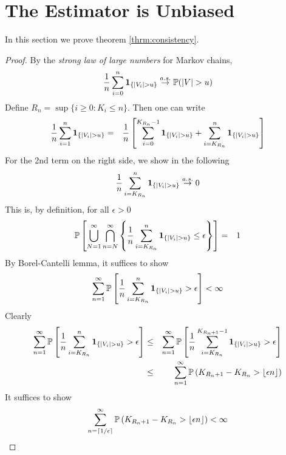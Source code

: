 \section{The Estimator is Unbiased}\label{sec:consistency}
In this section we prove theorem \ref{thrm:consistency}.
\begin{proof}
  By the {\em strong law of large numbers} for Markov chains,
  \begin{eqnarray*}
    {1 \over n} \sum_{i=0}^n \mathbf{1}_{\{|V_i| > u\}} \overset{a.s.}{\to} \mathbb{P}(|V| > u)
  \end{eqnarray*}
  Define $R_n =\sup\{i \geq 0: K_i \leq n\}$. Then one can write
  \begin{eqnarray}
    {1 \over n} \sum_{i=1}^n \mathbf{1}_{\{|V_i| > u\}}
    &=& 
    {1 \over n} \left[
      \sum_{i=0}^{K_{R_n}-1} \mathbf{1}_{\{|V_i| > u\}} + \sum_{i=K_{R_n}}^n \mathbf{1}_{\{|V_i| > u\}}
    \right]
    \label{eq:kioj}
  \end{eqnarray}
  For the 2nd term on the right side, we show in the following
  \begin{equation}
    \label{eq:frf}
    {1 \over n}\sum_{i=K_{R_n}}^n \mathbf{1}_{\{|V_i| > u\}} \overset{a.s.}{\to} 0
  \end{equation}
  This is, by definition, for all $\epsilon > 0$
  \begin{eqnarray*}
    \mathbb{P} \left[
      \bigcup_{N=1}^\infty \bigcap_{n=N}^\infty
      \left\{
        {1 \over n} \sum_{i=K_{R_n}}^{n} \mathbf{1}_{\{|V_i| > u\}} \leq \epsilon
      \right\}
    \right] &=& 1
  \end{eqnarray*}
  By Borel-Cantelli lemma, it suffices to show
  \[
  \sum_{n=1}^\infty \mathbb{P}\left[
    {1 \over n} \sum_{i=K_{R_n}}^{n} \mathbf{1}_{\{|V_i| > u\}} > \epsilon
  \right] < \infty
  \]
  Clearly
  \begin{eqnarray*}
    \sum_{n=1}^\infty \mathbb{P}\left[
      {1 \over n} \sum_{i=K_{R_n}}^{n} \mathbf{1}_{\{|V_i| > u\}} > \epsilon
    \right]
    &\leq&
    \sum_{n=1}^\infty \mathbb{P}\left[
      {1 \over n} \sum_{i=K_{R_n}}^{K_{R_n + 1} - 1} \mathbf{1}_{\{|V_i| > u\}} > \epsilon
    \right] \\
    &\leq&
    \sum_{n=1}^\infty \mathbb{P}\left(
      {K_{R_n + 1} - K_{R_n}} > \lfloor \epsilon n\rfloor
    \right)
  \end{eqnarray*}
  It suffices to show
  \[
  \sum_{n=\lceil 1/\epsilon\rceil}^\infty \mathbb{P}\left(
    {K_{R_n + 1} - K_{R_n}} > \lfloor \epsilon n\rfloor
  \right) < \infty
\]
\end{proof}

